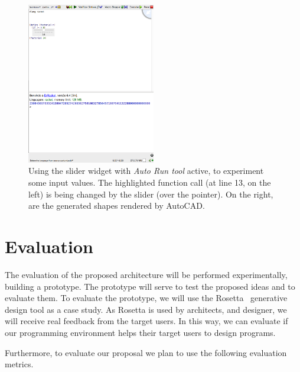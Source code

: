\begin{figure}[!h]
  \centering
  \includegraphics[width=0.5\textwidth]{images/slider-mac}
    \caption{Using the slider widget with \textit{Auto Run tool} active, to experiment some input values. The highlighted function call (at line 13, on the left) is being changed by the slider (over the pointer). On the right, are the generated shapes rendered by AutoCAD.}
  \label{fig:slidermac}
\end{figure}


\section{Evaluation}
\label{sec:eval}

The evaluation of the proposed architecture will be performed experimentally, building a prototype. The prototype will serve to test the proposed ideas and to evaluate them. To evaluate the prototype, we will use the Rosetta~\citep{lopes2011portable} generative design tool as a case study. As Rosetta is used by architects, and designer, we will receive real feedback from the target users. In this way, we can evaluate if our programming environment helps their target users to design programs.

Furthermore, to evaluate our proposal we plan to use the following evaluation metrics.

